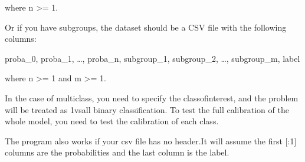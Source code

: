 \documentclass[letterpaper,10pt,english]{sphinxmanual}
\begin{document}
\sphinxAtStartPar
where n \textgreater{}= 1.

\sphinxAtStartPar
Or if you have subgroups, the dataset should be a CSV file with the following columns:

\sphinxAtStartPar
proba\_0, proba\_1, …, proba\_n, subgroup\_1, subgroup\_2, …, subgroup\_m, label

\sphinxAtStartPar
where n \textgreater{}= 1 and m \textgreater{}= 1.

\sphinxAtStartPar
In the case of multi\sphinxhyphen{}class, you need to specify the class\sphinxhyphen{}of\sphinxhyphen{}interest, and the problem will be treated as 1\sphinxhyphen{}vs\sphinxhyphen{}all binary classification. To test the full calibration of the whole model, you need to test the calibration of each class.

\sphinxAtStartPar
The program also works if your csv file has no header.It will assume the first {[}:\sphinxhyphen{}1{]} columns are the probabilities and the last column is the label.
\end{document}
